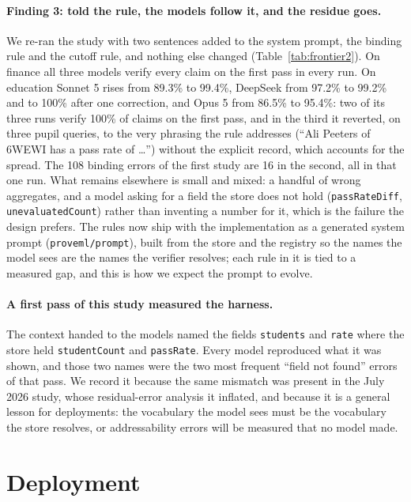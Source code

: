\documentclass[11pt,a4paper]{article}
\begin{document}
\paragraph{Finding 3: told the rule, the models follow it, and the residue goes.} We re-ran the study with two sentences added to the system prompt, the binding rule and the cutoff rule, and nothing else changed (Table~\ref{tab:frontier2}). On finance all three models verify every claim on the first pass in every run. On education Sonnet 5 rises from 89.3\% to 99.4\%, DeepSeek from 97.2\% to 99.2\% and to 100\% after one correction, and Opus 5 from 86.5\% to 95.4\%: two of its three runs verify 100\% of claims on the first pass, and in the third it reverted, on three pupil queries, to the very phrasing the rule addresses (``Ali Peeters of 6WEWI has a pass rate of \ldots'') without the explicit record, which accounts for the spread. The 108 binding errors of the first study are 16 in the second, all in that one run. What remains elsewhere is small and mixed: a handful of wrong aggregates, and a model asking for a field the store does not hold (\texttt{passRateDiff}, \texttt{unevaluatedCount}) rather than inventing a number for it, which is the failure the design prefers. The rules now ship with the implementation as a generated system prompt (\texttt{proveml/prompt}), built from the store and the registry so the names the model sees are the names the verifier resolves; each rule in it is tied to a measured gap, and this is how we expect the prompt to evolve.

\paragraph{A first pass of this study measured the harness.} The context handed to the models named the fields \texttt{students} and \texttt{rate} where the store held \texttt{studentCount} and \texttt{passRate}. Every model reproduced what it was shown, and those two names were the two most frequent ``field not found'' errors of that pass. We record it because the same mismatch was present in the July 2026 study, whose residual-error analysis it inflated, and because it is a general lesson for deployments: the vocabulary the model sees must be the vocabulary the store resolves, or addressability errors will be measured that no model made.

\section{Deployment}
\label{sec:deployment}
\end{document}
